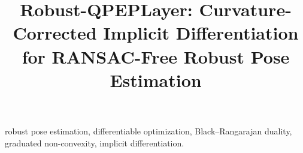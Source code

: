 \documentclass[conference]{IEEEtran}
\begin{document}
\title{Robust-QPEPLayer: Curvature-Corrected Implicit Differentiation for RANSAC-Free Robust Pose Estimation}

\author{
}

\maketitle

\begin{abstract}

\end{abstract}

\begin{IEEEkeywords}
robust pose estimation, differentiable optimization, Black--Rangarajan duality, graduated non-convexity, implicit differentiation.
\end{IEEEkeywords}









\balance



\newpage
\appendix

\end{document}
